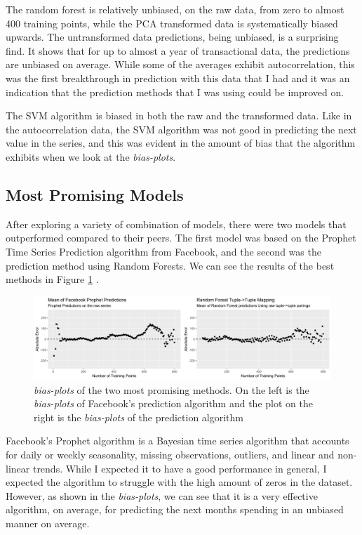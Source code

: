 \documentclass[11pt,a4paper]{article}
\newcommand{\bplots}{\textit{bias-plots}\xspace}
\begin{document}
The random forest is relatively unbiased, on the raw \yinyang data, from zero to almost 400 training points, while the PCA transformed data is systematically biased upwards.  The untransformed data predictions, being unbiased, is a surprising find. It shows that for up to almost a year of transactional data, the predictions are unbiased on average. While some of the averages exhibit autocorrelation, this was the first breakthrough in prediction with this data that I had and it was an indication that the prediction methods that I was using could be improved on.

The SVM algorithm is biased in both the raw and the transformed data. Like in the autocorrelation data, the SVM algorithm was not good in predicting the next value in the \yinyang series, and this was evident in the amount of bias that the algorithm exhibits when we look at the \bplots.  

\subsection{Most Promising Models}

After exploring a variety of combination of models, there were two models that outperformed compared to their peers. The first model was based on the Prophet Time Series Prediction algorithm from Facebook, and the second was the \yinyang prediction method using Random Forests. We can see the results of the best methods in Figure \ref{fig:mostpromisingmethods} . 


\begin{figure}
	\centering
	\includegraphics[width=1\linewidth]{../figures/most_promising_methods}
	\caption{\bplots of the two most promising methods. On the left is the \bplots of Facebook's prediction algorithm and the plot on the right is the \bplots of the \yinyang prediction algorithm }
	\label{fig:mostpromisingmethods}
\end{figure}


Facebook's Prophet algorithm is a Bayesian time series algorithm that accounts for daily or weekly seasonality, missing observations, outliers, and linear and non-linear trends. While I expected it to have a good performance in general, I expected the algorithm to struggle with the high amount of zeros in the dataset. However, as shown in the \bplots, we can see that it is a very effective algorithm, on average, for predicting the next months spending in an unbiased manner on average. 
\end{document}
